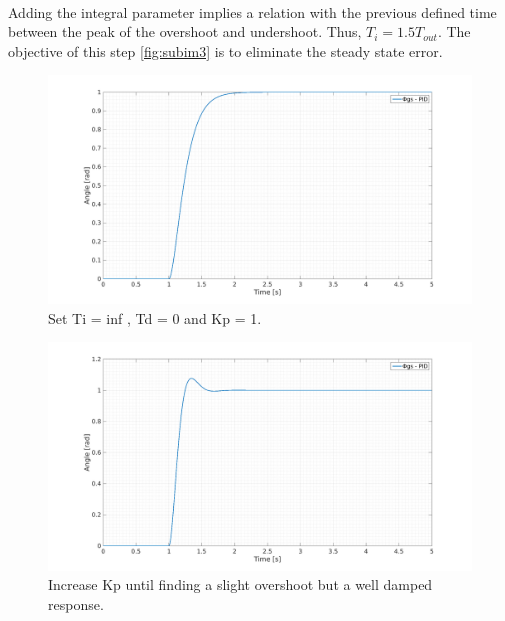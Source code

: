 \paragraph{}Adding the integral parameter implies a relation with the previous defined time between the peak of the overshoot and undershoot. Thus, $T_i = 1.5T_{out}$. The objective of this step \ref{fig:subim3} is to eliminate the steady state error.
\begin{figure}[H]
  \centering
  \includegraphics[scale=0.32]{figures/GG1.png}
  \caption{Set Ti = inf , Td = 0 and Kp = 1.}
  \label{fig:subim1}
\end{figure}

\begin{figure}[H]
  \centering
  \includegraphics[scale=0.32]{figures/GG2.png}
  \caption{Increase Kp until finding a slight overshoot but a well damped response.}
  \label{fig:subim2}
\end{figure}




